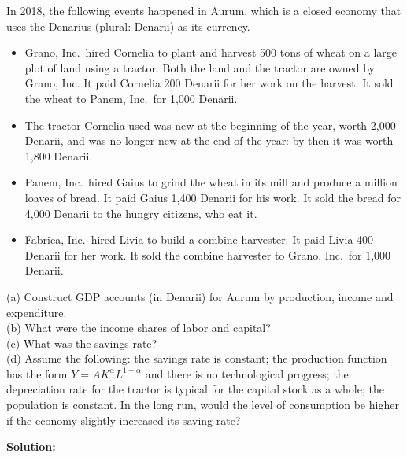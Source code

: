 \documentclass[12pt, letterpaper]{article}
\begin{document}
\begin{tcolorbox}[evenbox,title={Problem 5.8 \quad National Accounts and The Golden Rule}]
\begin{tcolorbox}[questionbox]
In 2018, the following events happened in Aurum, which is a closed economy that uses the
Denarius (plural: Denarii) as its currency.
\begin{itemize}[leftmargin=1.1em,itemsep=1pt,topsep=2pt]
\item Grano, Inc.\ hired Cornelia to plant and harvest 500 tons of wheat on a large plot of
land using a tractor. Both the land and the tractor are owned by Grano, Inc. It paid
Cornelia 200 Denarii for her work on the harvest. It sold the wheat to Panem, Inc.\ for
1,000 Denarii.
\item The tractor Cornelia used was new at the beginning of the year, worth 2,000 Denarii,
and was no longer new at the end of the year: by then it was worth 1,800 Denarii.
\item Panem, Inc.\ hired Gaius to grind the wheat in its mill and produce a million loaves
of bread. It paid Gaius 1,400 Denarii for his work. It sold the bread for 4,000 Denarii to
the hungry citizens, who eat it.
\item Fabrica, Inc.\ hired Livia to build a combine harvester. It paid Livia 400 Denarii for
her work. It sold the combine harvester to Grano, Inc.\ for 1,000 Denarii.
\end{itemize}
(a) Construct GDP accounts (in Denarii) for Aurum by production, income and expenditure.\\
(b) What were the income shares of labor and capital?\\
(c) What was the savings rate?\\
(d) Assume the following: the savings rate is constant; the production function has the form
$Y=AK^{\alpha}L^{1-\alpha}$ and there is no technological progress; the depreciation rate
for the tractor is typical for the capital stock as a whole; the population is constant. In
the long run, would the level of consumption be higher if the economy slightly increased its
saving rate?
\end{tcolorbox}

\textbf{Solution:}
\begin{enumerate}


\end{enumerate}
\end{tcolorbox}
\end{document}
